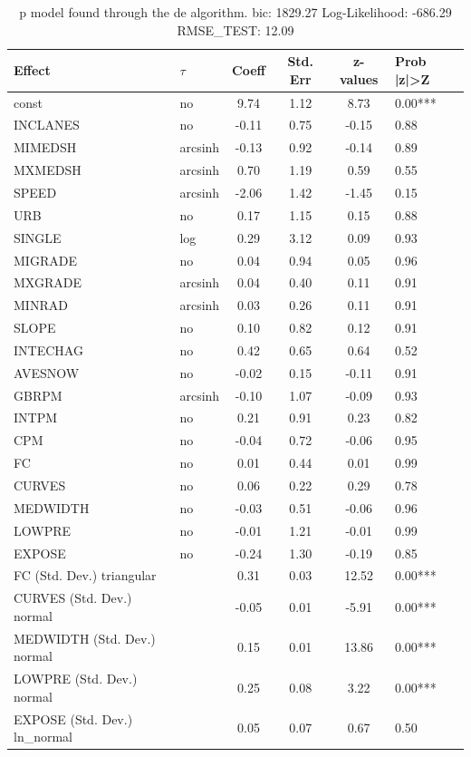 \begin{table}
	\caption{p model found through the de algorithm. bic: 1829.27 Log-Likelihood: -686.29 RMSE_TEST: 12.09}
	\begin{center}
		\begin{tabular}{|l|l|c|c|c|l|}
			\hline
			Effect & $\tau$ & Coeff & Std. Err & z-values & Prob |z|>Z \\
			\hline
			const & no & 9.74 & 1.12 & 8.73 & 0.00*** \\
			\hline
			INCLANES & no & -0.11 & 0.75 & -0.15 & 0.88 \\
			\hline
			MIMEDSH & arcsinh & -0.13 & 0.92 & -0.14 & 0.89 \\
			\hline
			MXMEDSH & arcsinh & 0.70 & 1.19 & 0.59 & 0.55 \\
			\hline
			SPEED & arcsinh & -2.06 & 1.42 & -1.45 & 0.15 \\
			\hline
			URB & no & 0.17 & 1.15 & 0.15 & 0.88 \\
			\hline
			SINGLE & log & 0.29 & 3.12 & 0.09 & 0.93 \\
			\hline
			MIGRADE & no & 0.04 & 0.94 & 0.05 & 0.96 \\
			\hline
			MXGRADE & arcsinh & 0.04 & 0.40 & 0.11 & 0.91 \\
			\hline
			MINRAD & arcsinh & 0.03 & 0.26 & 0.11 & 0.91 \\
			\hline
			SLOPE & no & 0.10 & 0.82 & 0.12 & 0.91 \\
			\hline
			INTECHAG & no & 0.42 & 0.65 & 0.64 & 0.52 \\
			\hline
			AVESNOW & no & -0.02 & 0.15 & -0.11 & 0.91 \\
			\hline
			GBRPM & arcsinh & -0.10 & 1.07 & -0.09 & 0.93 \\
			\hline
			INTPM & no & 0.21 & 0.91 & 0.23 & 0.82 \\
			\hline
			CPM & no & -0.04 & 0.72 & -0.06 & 0.95 \\
			\hline
			FC & no & 0.01 & 0.44 & 0.01 & 0.99 \\
			\hline
			CURVES & no & 0.06 & 0.22 & 0.29 & 0.78 \\
			\hline
			MEDWIDTH & no & -0.03 & 0.51 & -0.06 & 0.96 \\
			\hline
			LOWPRE & no & -0.01 & 1.21 & -0.01 & 0.99 \\
			\hline
			EXPOSE & no & -0.24 & 1.30 & -0.19 & 0.85 \\
			\hline
			FC (Std. Dev.) triangular &  & 0.31 & 0.03 & 12.52 & 0.00*** \\
			\hline
			CURVES (Std. Dev.) normal &  & -0.05 & 0.01 & -5.91 & 0.00*** \\
			\hline
			MEDWIDTH (Std. Dev.) normal &  & 0.15 & 0.01 & 13.86 & 0.00*** \\
			\hline
			LOWPRE (Std. Dev.) normal &  & 0.25 & 0.08 & 3.22 & 0.00*** \\
			\hline
			EXPOSE (Std. Dev.) ln_normal &  & 0.05 & 0.07 & 0.67 & 0.50 \\
			\hline
		\end{tabular}
	\end{center}
\end{table}